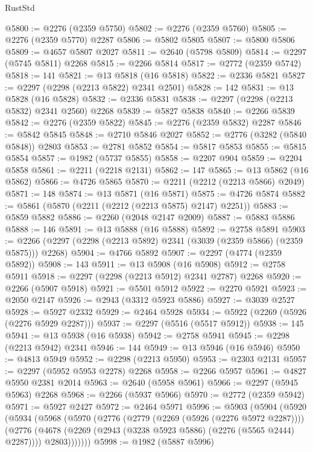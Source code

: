 \begin{lexlean}{RustStd}
\begin{coremodule}
@5800 := @2276 (@2359 @5750)
@5802 := @2276 (@2359 @5760)
@5805 := @2276 (@2359 @5770) @2287
@5806 := @5802 @5805
@5807 := @5800 @5806
@5809 := @4657 @5807 @2027
@5811 := @2640 (@5798 @5809)
@5814 := @2297 (@5745 @5811) @2268
@5815 := @2266 @5814
@5817 := @2772 (@2359 @5742)
@5818 := 141
@5821 := @13 @5818 (@16 @5818)
@5822 := @2336 @5821
@5827 := @2297 (@2298 (@2213 @5822) @2341 @2501)
@5828 := 142
@5831 := @13 @5828 (@16 @5828)
@5832 := @2336 @5831
@5838 := @2297 (@2298 (@2213 @5832) @2341 @2560) @2268
@5839 := @5827 @5838
@5840 := @2266 @5839
@5842 := @2276 (@2359 @5822)
@5845 := @2276 (@2359 @5832) @2287
@5846 := @5842 @5845
@5848 := @2710 @5846 @2027
@5852 := @2776 (@3282 (@5840 @5848)) @2803
@5853 := @2781 @5852
@5854 := @5817 @5853
@5855 := @5815 @5854
@5857 := @1982 (@5737 @5855)
@5858 := @2207 @904
@5859 := @2204 @5858
@5861 := @2211 (@2218 @2131)
@5862 := 147
@5865 := @13 @5862 (@16 @5862)
@5866 := @4726 @5865
@5870 := @2211 (@2212 (@2213 @5866) @2049)
@5871 := 148
@5874 := @13 @5871 (@16 @5871)
@5875 := @4726 @5874
@5882 := @5861 (@5870 (@2211 (@2212 (@2213 @5875) @2147) @2251))
@5883 := @5859 @5882
@5886 := @2260 (@2048 @2147 @2009)
@5887 := @5883 @5886
@5888 := 146
@5891 := @13 @5888 (@16 @5888)
@5892 := @2758 @5891
@5903 := @2266 (@2297 (@2298 (@2213 @5892) @2341 (@3039 (@2359 @5866) (@2359 @5875))) @2268)
@5904 := @4766 @5892
@5907 := @2297 (@4774 (@2359 @5892))
@5908 := 143
@5911 := @13 @5908 (@16 @5908)
@5912 := @2758 @5911
@5918 := @2297 (@2298 (@2213 @5912) @2341 @2787) @2268
@5920 := @2266 (@5907 @5918)
@5921 := @5501 @5912
@5922 := @2270 @5921
@5923 := @2050 @2147
@5926 := @2943 (@3312 @5923 @5886)
@5927 := @3039 @2527
@5928 := @5927 @2332
@5929 := @2464 @5928
@5934 := @5922 (@2269 (@5926 (@2276 @5929 @2287)))
@5937 := @2297 (@5516 (@5517 @5912))
@5938 := 145
@5941 := @13 @5938 (@16 @5938)
@5942 := @2758 @5941
@5945 := @2298 (@2213 @5942) @2341
@5946 := 144
@5949 := @13 @5946 (@16 @5946)
@5950 := @4813 @5949
@5952 := @2298 (@2213 @5950)
@5953 := @2303 @2131
@5957 := @2297 (@5952 @5953 @2278) @2268
@5958 := @2266 @5957
@5961 := @4827 @5950 @2381 @2014
@5963 := @2640 (@5958 @5961)
@5966 := @2297 (@5945 @5963) @2268
@5968 := @2266 (@5937 @5966)
@5970 := @2772 (@2359 @5942)
@5971 := @5927 @2427
@5972 := @2464 @5971
@5996 := @5903
    (@5904
      (@5920
        (@5934
          (@5968
            (@5970
              (@2776
                (@2779 (@2269 (@5926 (@2276 @5972 @2287))))
                (@2776
                  (@4678 (@2269 (@2943 (@3238 @5923 @5886) (@2276 (@5565 @2444) @2287))))
                  @2803)))))))
@5998 := @1982 (@5887 @5996)

\end{coremodule}
\end{lexlean}
